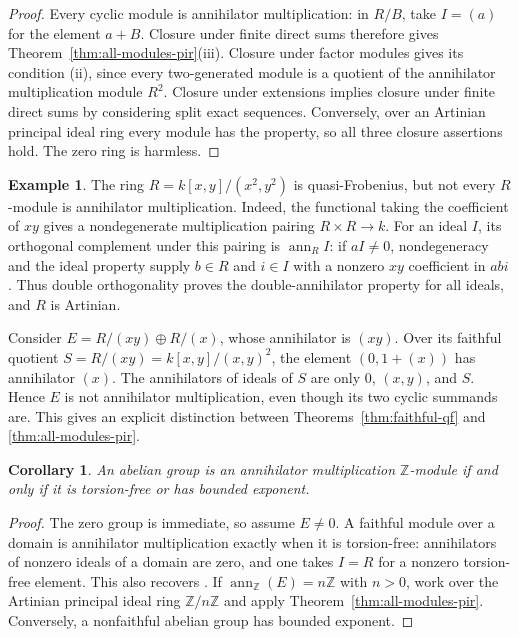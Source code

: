 \documentclass[11pt]{amsart}
\theoremstyle{plain}
\newtheorem{corollary}[theorem]{Corollary}
\theoremstyle{definition}
\newtheorem{example}[theorem]{Example}
\theoremstyle{remark}
\newcommand{\ann}{\operatorname{ann}}
\numberwithin{equation}{section}
\begin{document}
\begin{proof}
Every cyclic module is annihilator multiplication: in $R/B$, take
$I=(a)$ for the element $a+B$.
Closure under finite direct sums therefore gives
Theorem~\ref{thm:all-modules-pir}(iii).
Closure under factor modules gives its condition (ii), since every
two-generated module is a quotient of the annihilator multiplication
module $R^2$. Closure under extensions implies closure under finite
direct sums by considering split exact sequences.
Conversely, over an Artinian principal ideal ring every module has the
property, so all three closure assertions hold. The zero ring is harmless.
\end{proof}

\begin{example}\label{ex:qf-not-universal}
The ring $R=k[x,y]/(x^2,y^2)$ is quasi-Frobenius, but not every
$R$-module is annihilator multiplication. Indeed, the functional taking
the coefficient of $xy$ gives a nondegenerate multiplication pairing
$R\times R\to k$. For an ideal $I$, its orthogonal complement under
this pairing is $\ann_R I$: if $aI\ne0$, nondegeneracy and the ideal
property supply $b\in R$ and $i\in I$ with a nonzero $xy$ coefficient
in $abi$. Thus double orthogonality proves the double-annihilator
property for all ideals, and $R$ is Artinian.

Consider $E=R/(xy)\oplus R/(x)$, whose annihilator is $(xy)$.
Over its faithful quotient $S=R/(xy)=k[x,y]/(x,y)^2$, the element
$(0,1+(x))$ has annihilator $(x)$.
The annihilators of ideals of $S$ are only $0$, $(x,y)$, and $S$.
Hence $E$ is not annihilator multiplication, even though its two cyclic
summands are. This gives an explicit distinction between
Theorems~\ref{thm:faithful-qf} and \ref{thm:all-modules-pir}.
\end{example}

\begin{corollary}\label{cor:abelian-groups}
An abelian group is an annihilator multiplication $\mathbb Z$-module
if and only if it is torsion-free or has bounded exponent.
\end{corollary}

\begin{proof}
The zero group is immediate, so assume $E\ne0$.
A faithful module over a domain is annihilator multiplication exactly
when it is torsion-free: annihilators of nonzero ideals of a domain
are zero, and one takes $I=R$ for a nonzero torsion-free element.
This also recovers \cite[Theorem~4]{KocAMM}.
If $\ann_{\mathbb Z}(E)=n\mathbb Z$ with $n>0$, work over the
Artinian principal ideal ring $\mathbb Z/n\mathbb Z$ and apply
Theorem~\ref{thm:all-modules-pir}.
Conversely, a nonfaithful abelian group has bounded exponent.
\end{proof}
\end{document}
